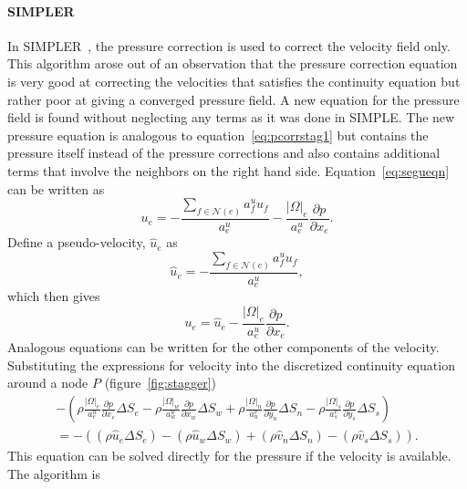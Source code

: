 \paragraph{SIMPLER} In SIMPLER~\cite{Patankar1980}, the pressure correction is used to correct the velocity field only. This algorithm arose out of an observation that the pressure correction equation is very good at correcting the velocities that satisfies the continuity equation but rather poor at giving a converged pressure field. A new equation for the pressure field is found without neglecting any terms as it was done in SIMPLE. The new pressure equation is analogous to equation~\ref{eq:pcorrstag1} but contains the pressure itself instead of the pressure corrections and also contains additional terms that involve the neighbors on the right hand side. Equation~\ref{eq:segueqn} can be written as 
\begin{equation*}
 u_e = -\frac{\sum_{f \in\mathcal{N}(e)} a_f^u u_f}{a_e^u}  - \frac{|\Omega|_e}{a_e^u} \frac{\partial p}{\partial x_e}.
\end{equation*}
Define a pseudo-velocity, $\hat{u}_e$ as
\begin{equation*}
\hat{u}_e = -\frac{\sum_{f \in\mathcal{N}(e)} a_f^u u_f}{a_e^u},
\end{equation*}
which then gives
\begin{equation}
u_e = \hat{u}_e - \frac{|\Omega|_e}{a_e^u} \frac{\partial p}{\partial x_e}. 
\end{equation}
Analogous equations can be written for the other components of the velocity. Substituting the expressions for velocity into the discretized continuity equation around a node $P$ (figure~\ref{fig:stagger})
\begin{align}
-\left(\rho \frac{|\Omega|_e}{a_e^u} \frac{\partial p}{\partial x_e} \Delta S_e - \rho\frac{|\Omega|_w}{a_w^u} \frac{\partial p}{\partial x_w} \Delta S_w + \rho \frac{|\Omega|_n}{a_n^v} \frac{\partial p}{\partial y_n} \Delta S_n - \rho \frac{|\Omega|_s}{a_s^v} \frac{\partial p}{\partial y_s} \Delta S_s\right) \nonumber \\  = -\left( (\rho \hat{u}_e \Delta S_e) - (\rho \hat{u}_w \Delta S_w) + (\rho \hat{v}_n \Delta S_n) - (\rho \hat{v}_s \Delta S_s) \right).
\label{eq:psimpler}
\end{align}
This equation can be solved directly for the pressure if the velocity is available. 
The algorithm is 
